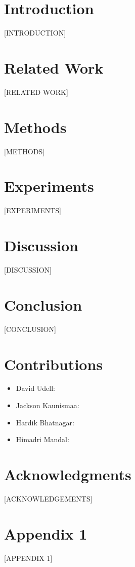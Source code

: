 \documentclass[10pt]{article}
\begin{document}

\printAffiliationsAndNotice{}

\begin{abstract}
[ABSTRACT]
\end{abstract}

\section{Introduction}
[INTRODUCTION]

\section{Related Work}
[RELATED WORK]

\section{Methods}
[METHODS]

\section{Experiments}
[EXPERIMENTS]

\section{Discussion}
[DISCUSSION]

\section{Conclusion}
[CONCLUSION]

\section*{Contributions}
\begin{itemize}
\item David Udell:
\item Jackson Kaunismaa:
\item Hardik Bhatnagar:
\item Himadri Mandal:
\end{itemize}

\section*{Acknowledgments}
[ACKNOWLEDGEMENTS]





\newpage
\appendix
\onecolumn
\section{Appendix 1}
[APPENDIX 1]
\end{document}
